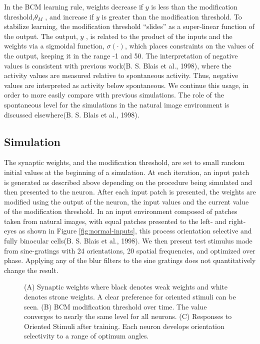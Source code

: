 \documentclass[
  onecolumn]{article}
\begin{document}
In the BCM learning rule, weights decrease if \(y\) is less than the
modification threshold,\(\theta_M\) , and increase if \(y\) is greater
than the modification threshold. To stabilize learning, the modification
threshold ``slides'' as a super-linear function of the output. The
output, \(y\) , is related to the product of the inputs and the weights
via a sigmoidal function, \(\sigma(\cdot)\), which places constraints on
the values of the output, keeping it in the range -1 and 50. The
interpretation of negative values is consistent with previous work(B. S.
Blais et al., 1998), where the activity values are measured relative to
spontaneous activity. Thus, negative values are interpreted as activity
below spontaneous. We continue this usage, in order to more easily
compare with previous simulations. The role of the spontaneous level for
the simulations in the natural image environment is discussed
elsewhere(B. S. Blais et al., 1998).

\hypertarget{simulation}{%
\subsection{Simulation}\label{simulation}}

The synaptic weights, and the modification threshold, are set to small
random initial values at the beginning of a simulation. At each
iteration, an input patch is generated as described above depending on
the procedure being simulated and then presented to the neuron. After
each input patch is presented, the weights are modified using the output
of the neuron, the input values and the current value of the
modification threshold. In an input environment composed of patches
taken from natural images, with equal patches presented to the left- and
right-eyes as shown in Figure \ref{fig:normal-inputs}, this process
orientation selective and fully binocular cells(B. S. Blais et al.,
1998). We then present test stimulus made from sine-gratings with 24
orientations, 20 spatial frequencies, and optimized over phase. Applying
any of the blur filters to the sine gratings does not quantitatively
change the result.

\begin{figure}
\hypertarget{fig:rf-theta-tuning-curve}{%
\centering

\caption{(A) Synaptic weights where black denotes weak weights and white
denotes strone weights. A clear preference for oriented stimuli can be
seen. (B) BCM modification threshold over time. The value converges to
nearly the same level for all neurons. (C) Responses to Oriented Stimuli
after training. Each neuron develops orientation selectivity to a range
of optimum angles.}\label{fig:rf-theta-tuning-curve}
}
\end{figure}
\end{document}
